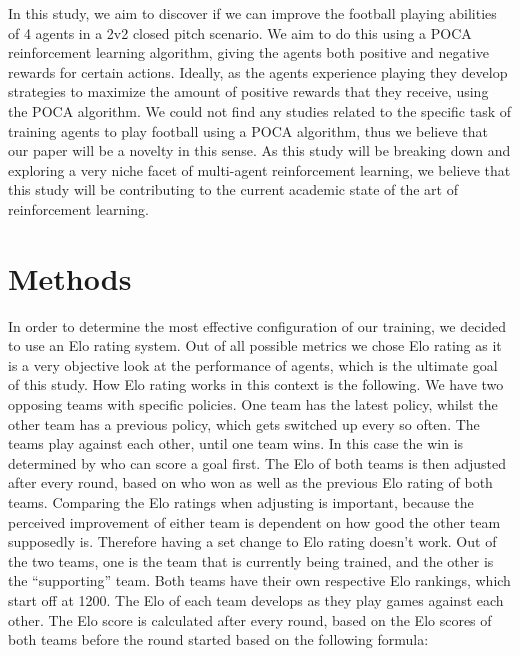 \documentclass{LSkill}
\begin{document}
In this study, we aim to discover if we can improve the football playing abilities of 4 agents in a 2v2 closed pitch scenario. We aim to do this using a POCA reinforcement learning algorithm, giving the agents both positive and negative rewards for certain actions. Ideally, as the agents experience playing they develop strategies to maximize the amount of positive rewards that they receive, using the POCA algorithm. We could not find any studies related to the specific task of training agents to play football using a POCA algorithm, thus we believe that our paper will be a novelty in this sense. As this study will be breaking down and exploring a very niche facet of multi-agent reinforcement learning, we believe that this study will be contributing to the current academic state of the art of reinforcement learning. 

\section{Methods}
In order to determine the most effective configuration of our training, we decided to use an Elo rating system. Out of all possible metrics we chose Elo rating as it is a very objective look at the performance of agents, which is the ultimate goal of this study. 
How Elo rating works in this context is the following. We have two opposing teams with specific policies. One team has the latest policy, whilst the other team has a previous policy, which gets switched up every so often. The teams play against each other, until one team wins. In this case the win is determined by who can score a goal first. The Elo of both teams is then adjusted after every round, based on who won as well as the previous Elo rating of both teams. Comparing the Elo ratings when adjusting is important, because the perceived improvement of either team is dependent on how good the other team supposedly is. Therefore having a set change to Elo rating doesn’t work.
Out of the two teams, one is the team that is currently  being trained, and the other is the “supporting” team. Both teams have their own respective Elo rankings, which start off at 1200. The Elo of each team develops as they play games against each other. The Elo score is calculated after every round, based on the Elo scores of both teams before the round started based on the following formula: 
\end{document}
